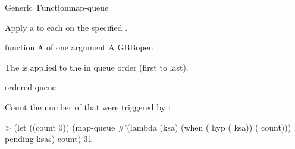 \documentclass[10pt,twoside,english,pdftex]{article}
\begin{document}

\begin{functiondoc}{Generic~Function}{map-queue}{}
%
%

\fnsyntax

\fnpurpose Apply a  to each  on the
specified .

\fnmethods
{}

\fnpackage {}

\fnmodule {}

\fnargs
\begin{args}{function}
\arg[function] A  of one argument
\arg[queue] A GBBopen 
\end{args}

\fndescription The  is applied to the
 in queue order (first to last).

\begin{alsos}{ordered-queue}
\also[do-queue]
\also[queue]
\end{alsos}

\fnexample
{}%
%
%
Count the number of  that were triggered by
: 
\begin{example}
> (let ((count 0))
    (map-queue #'(lambda (ksa)
                   (when ( hyp ( ksa))
                     ( count)))
               pending-ksas)
     count)
31
\end{example}

\end{functiondoc}

\end{document}
